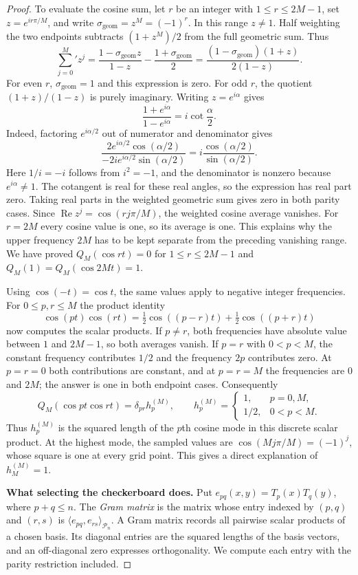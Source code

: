 \begin{proof}
To evaluate the cosine sum, let $r$ be an integer with
$1\leq r\leq2M-1$, set $z=e^{ir\pi/M}$, and write
$\sigma_{\mathrm{geom}}=z^M=(-1)^r$. In this range $z\ne1$. Half weighting the two
endpoints subtracts $(1+z^M)/2$ from the full geometric sum. Thus
\[
 \sum_{j=0}^M{}'z^j
 =\frac{1-\sigma_{\mathrm{geom}} z}{1-z}-\frac{1+\sigma_{\mathrm{geom}}}2
 =\frac{(1-\sigma_{\mathrm{geom}})(1+z)}{2(1-z)}.
\]
For even $r$, $\sigma_{\mathrm{geom}}=1$ and this expression is zero. For odd $r$,
the quotient $(1+z)/(1-z)$ is purely imaginary. Writing
$z=e^{i\alpha}$ gives
\[
 \frac{1+e^{i\alpha}}{1-e^{i\alpha}}
   =i\cot\frac\alpha2.
\]
Indeed, factoring $e^{i\alpha/2}$ out of numerator and denominator
gives
\[
 \frac{2e^{i\alpha/2}\cos(\alpha/2)}
      {-2ie^{i\alpha/2}\sin(\alpha/2)}
 =i\frac{\cos(\alpha/2)}{\sin(\alpha/2)}.
\]
Here $1/i=-i$ follows from $i^2=-1$, and the denominator is nonzero
because $e^{i\alpha}\ne1$. The cotangent is real for these real
angles, so the expression has real part zero. Taking real parts in
the weighted geometric sum gives zero in both parity cases. Since
$\operatorname{Re}z^j=\cos(rj\pi/M)$, the weighted cosine average
vanishes. For $r=2M$ every cosine value is one, so its average is one.
This explains why the upper frequency $2M$ has to be kept separate
from the preceding vanishing range. We have proved
$Q_M(\cos rt)=0$ for $1\leq r\leq2M-1$ and
$Q_M(1)=Q_M(\cos2Mt)=1$.

Using $\cos(-t)=\cos t$, the same values apply to negative integer
frequencies. For $0\leq p,r\leq M$ the product identity
\[
 \cos(pt)\cos(rt)=\tfrac12\cos((p-r)t)
                         +\tfrac12\cos((p+r)t)
\]
now computes the scalar products. If $p\ne r$, both frequencies have
absolute value between $1$ and $2M-1$, so both averages vanish. If
$p=r$ with $0<p<M$, the constant frequency contributes $1/2$ and
the frequency $2p$ contributes zero. At $p=r=0$ both contributions
are constant, and at $p=r=M$ the frequencies are $0$ and $2M$;
the answer is one in both endpoint cases. Consequently
\[
 Q_M(\cos pt\cos rt)=\delta_{pr}h_p^{(M)},\qquad
 h_p^{(M)}=\begin{cases}1,&p=0,M,\\1/2,&0<p<M.\end{cases}
\]
Thus $h_p^{(M)}$ is the squared length of the $p$th cosine mode in this
discrete scalar product. At the highest mode, the sampled values are
$\cos(Mj\pi/M)=(-1)^j$, whose square is one at every grid point.
This gives a direct explanation of $h_M^{(M)}=1$.

\noindent\textbf{What selecting the checkerboard does.}
Put $e_{pq}(x,y)=T_p(x)T_q(y)$, where $p+q\leq n$.
The \emph{Gram matrix} is the matrix whose entry indexed by $(p,q)$
and $(r,s)$ is $\langle e_{pq},e_{rs}\rangle_{\mathcal P_n}$.
A Gram matrix records all pairwise scalar products of a chosen basis.
Its diagonal entries are the squared lengths of the basis vectors, and
an off-diagonal zero expresses orthogonality. We compute each entry
with the parity restriction included.


\end{proof}
